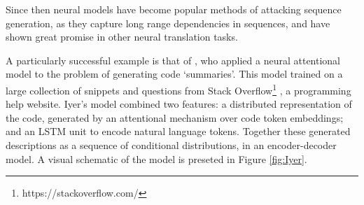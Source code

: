 Since then neural models have become popular methods of attacking sequence generation, as they capture long range dependencies in sequences, and have shown great promise in other neural translation tasks.

A particularly successful example is that of \citet{iyer_summarizing_2016}, who applied a neural attentional model to the problem of generating code `summaries'. This model trained on a large collection of snippets and questions from Stack Overflow\footnote{https://stackoverflow.com/}
, a programming help website.   Iyer's model combined two features: a distributed representation of the code, generated by an attentional mechanism \citep{luong_effective_2015} over code token embeddings; and an LSTM unit \citep{hochreiter_long_1997} to encode natural language tokens. Together these generated descriptions as a sequence of conditional distributions, in an encoder-decoder model. A visual schematic of the model is preseted in Figure \ref{fig:Iyer}.







